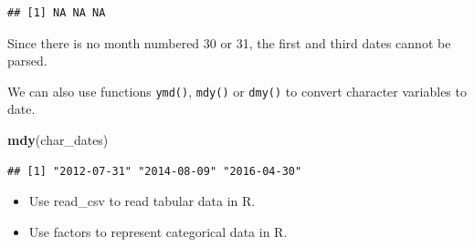 \documentclass[
]{article}
\newenvironment{Shaded}{\begin{snugshade}}{\end{snugshade}}
\newcommand{\FunctionTok}[1]{\textcolor[rgb]{0.13,0.29,0.53}{\textbf{#1}}}
\newcommand{\NormalTok}[1]{#1}
\providecommand{\tightlist}{%
  \setlength{\itemsep}{0pt}\setlength{\parskip}{0pt}}
\begin{document}
\begin{verbatim}
## [1] NA NA NA
\end{verbatim}

Since there is no month numbered 30 or 31, the first and third dates
cannot be parsed.

We can also use functions \texttt{ymd()}, \texttt{mdy()} or
\texttt{dmy()} to convert character variables to date.

\begin{Shaded}
\begin{Highlighting}[]
\FunctionTok{mdy}\NormalTok{(char\_dates)}
\end{Highlighting}
\end{Shaded}

\begin{verbatim}
## [1] "2012-07-31" "2014-08-09" "2016-04-30"
\end{verbatim}

\begin{itemize}
\tightlist
\item
  Use read\_csv to read tabular data in R.
\item
  Use factors to represent categorical data in R.
\end{itemize}
\end{document}
